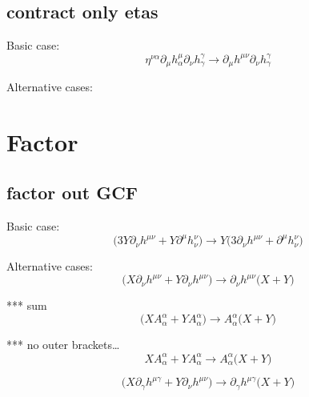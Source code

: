 \documentclass{article}
\def\){\Big)}
\def\({\Big(}
\begin{document}
 \subsection{contract only etas}

Basic case:
\begin{equation}
\eta^{\nu \alpha} \partial_{\mu} h^{\mu}_{\alpha}\partial_{\nu} h^{\gamma}_{\gamma} 	 \rightarrow  \partial_{\mu}h^{\mu \nu} \partial_{\nu}h_{\gamma}^{\gamma}
\end{equation}

Alternative cases:













\section{Factor}
 \subsection{factor out GCF}

Basic case: 
\begin{equation}
 \(3Y \partial_{\nu}h^{\mu \nu} + Y \partial^{\mu} h^{\nu }_{\nu}\) \rightarrow
 Y \(3 \partial_{\nu}h^{\mu \nu} + \partial^{\mu}h_{\nu}^{\nu} \)
\end{equation}

Alternative cases:
\begin{equation}
\(X \partial_{\nu}h^{\mu \nu} + Y \partial_{\nu} h^{\mu \nu}\) \rightarrow
\partial_{\nu}h^{\mu \nu} \(X +Y \)
\end{equation}

*** sum
\begin{equation}
\(X A^{\alpha}_{\alpha} + Y A^{\alpha}_{\alpha}\) \rightarrow
A_{\alpha}^{\alpha} \(X +Y \)
\end{equation}

***  no outer brackets…
\begin{equation}
X A^{\alpha}_{\alpha} + Y A^{\alpha}_{\alpha}  \rightarrow
A_{\alpha}^{\alpha} \(X +Y \)
\end{equation}

\begin{equation}
\(X \partial_{\gamma}h^{\mu \gamma} + Y \partial_{\nu} h^{\mu \nu}\) \rightarrow
\partial_{\gamma}h^{\mu \gamma} \(X +Y \)
\end{equation}
\end{document}
